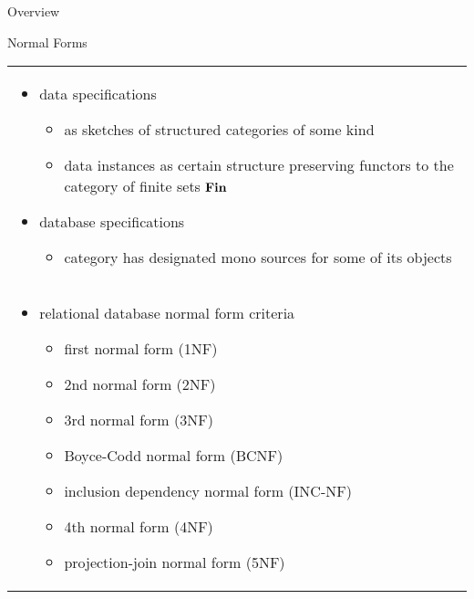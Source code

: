 \begin{frame}{Overview}
\end{frame}

\begin{frame}{Normal Forms}
\begin{center}
\begin{tabular}{p{12cm}}
\begin{itemize}
\item data specifications 
\begin{itemize}
    \item as sketches of structured categories of some kind
    \item data instances as certain structure preserving functors to the category of finite sets $\textbf{Fin}$
\end{itemize}
\item database specifications
\begin{itemize}
     \item category has designated mono sources for some of its objects 
\end{itemize}
\end{itemize} \\
\hdashline
\begin{itemize}
\item relational database normal form criteria  
\begin{itemize}
    \item first normal form (1NF)
    \item 2nd normal form (2NF)
    \item 3rd normal form (3NF)
    \item Boyce-Codd normal form (BCNF)
    \item inclusion dependency normal form (INC-NF)
    \item 4th normal form (4NF)
    \item projection-join normal form (5NF)
\end{itemize}
\end{itemize}
\end{tabular}
\end{center}
\end{frame}

